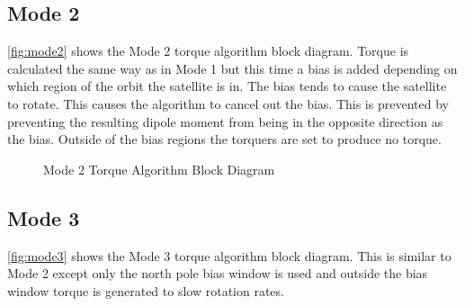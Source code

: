\subsection{Mode 2}

\autoref{fig:mode2} shows the Mode 2 torque algorithm block diagram. Torque is calculated the same way as in Mode 1 but this time a bias is added depending on which region of the orbit the satellite is in. The bias tends to cause the satellite to rotate. This causes the algorithm to cancel out the bias. This is prevented by preventing the resulting dipole moment from being in the opposite direction as the bias. Outside of the bias regions the torquers are set to produce no torque.

\begin{figure}[H]
    \centering
    \caption{Mode 2 Torque Algorithm Block Diagram}
    \label{fig:mode2}
\end{figure}

\subsection{Mode 3}

\autoref{fig:mode3} shows the Mode 3 torque algorithm block diagram. This is similar to Mode 2 except only the north pole bias window is used and outside the bias window torque is generated to slow rotation rates.

